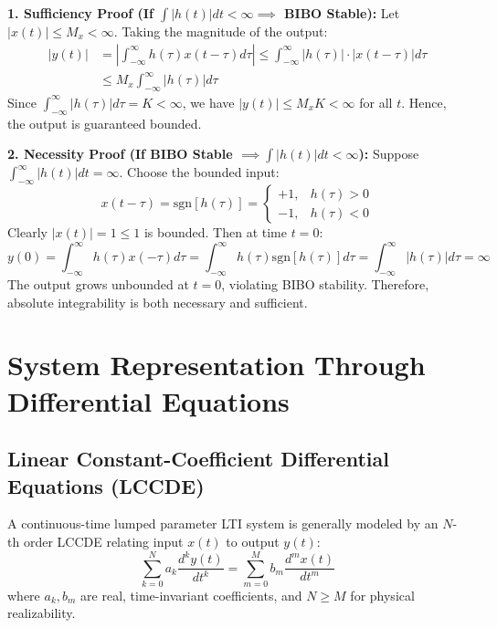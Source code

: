 \documentclass[12pt,a4paper]{article}
\begin{document}
\begin{tcolorbox}[examplebox, title={\textbf{Rigorous Proof of BIBO Stability Criterion (Sufficiency and Necessity)}}]
\textbf{1. Sufficiency Proof (If $\int |h(t)|dt < \infty \implies$ BIBO Stable):}
Let $|x(t)| \le M_x < \infty$. Taking the magnitude of the output:
\begin{align*}
  |y(t)| &= \left| \int_{-\infty}^{\infty} h(\tau) x(t - \tau) d\tau \right| \le \int_{-\infty}^{\infty} |h(\tau)| \cdot |x(t - \tau)| d\tau \\
  &\le M_x \int_{-\infty}^{\infty} |h(\tau)| d\tau
\end{align*}
Since $\int_{-\infty}^\infty |h(\tau)| d\tau = K < \infty$, we have $|y(t)| \le M_x K < \infty$ for all $t$. Hence, the output is guaranteed bounded.

\textbf{2. Necessity Proof (If BIBO Stable $\implies \int |h(t)|dt < \infty$):}
Suppose $\int_{-\infty}^\infty |h(t)|dt = \infty$. Choose the bounded input:
\begin{equation*}
  x(t - \tau) = \text{sgn}[h(\tau)] = \begin{cases} +1, & h(\tau) > 0 \\ -1, & h(\tau) < 0 \end{cases}
\end{equation*}
Clearly $|x(t)| = 1 \le 1$ is bounded. Then at time $t = 0$:
\begin{equation*}
  y(0) = \int_{-\infty}^{\infty} h(\tau) x(-\tau) d\tau = \int_{-\infty}^{\infty} h(\tau) \text{sgn}[h(\tau)] d\tau = \int_{-\infty}^{\infty} |h(\tau)| d\tau = \infty
\end{equation*}
The output grows unbounded at $t=0$, violating BIBO stability. Therefore, absolute integrability is both necessary and sufficient.
\end{tcolorbox}

\section{System Representation Through Differential Equations}

\subsection{Linear Constant-Coefficient Differential Equations (LCCDE)}
A continuous-time lumped parameter LTI system is generally modeled by an $N$-th order LCCDE relating input $x(t)$ to output $y(t)$:
\begin{equation}
  \sum_{k=0}^{N} a_k \frac{d^k y(t)}{dt^k} = \sum_{m=0}^{M} b_m \frac{d^m x(t)}{dt^m}
\end{equation}
where $a_k, b_m$ are real, time-invariant coefficients, and $N \ge M$ for physical realizability.
\end{document}
